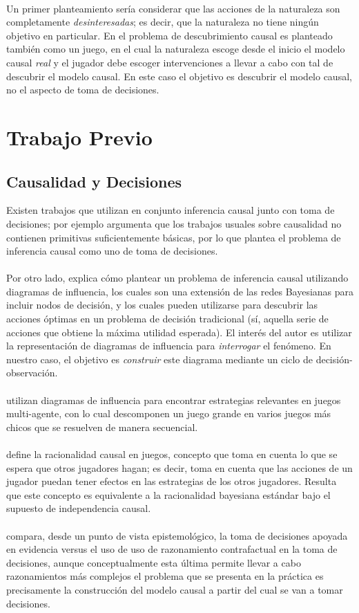 \documentclass[11pt]{article}
\theoremstyle{plain}
\begin{document}
\\
\indent Un primer planteamiento sería considerar que las acciones de la naturaleza son completamente \textit{desinteresadas}; es decir, que la naturaleza no tiene ningún objetivo en particular. En \cite{eberhardt2008causal} el problema de descubrimiento causal es planteado también como un juego, en el cual la naturaleza escoge desde el inicio el modelo causal \textit{real} y el jugador debe escoger intervenciones a llevar a cabo con tal de descubrir el modelo causal. En este caso el objetivo es descubrir el modelo causal, no el aspecto de toma de decisiones.
\section{Trabajo Previo}
\subsection{Causalidad y Decisiones}
Existen trabajos que utilizan en conjunto inferencia causal junto con toma de decisiones; por ejemplo \cite{heckerman1995decision} argumenta que los trabajos usuales sobre causalidad no contienen primitivas suficientemente básicas, por lo que plantea el problema de inferencia causal como uno de toma de decisiones.\\
\\
\indent Por otro lado, \cite{dawid2002influence} explica cómo plantear un problema de inferencia causal utilizando diagramas de influencia, los cuales son una extensión de las redes Bayesianas para incluir nodos de decisión, y los cuales pueden utilizarse para descubrir las acciones óptimas en un problema de decisión tradicional (sí, aquella serie de acciones que obtiene la máxima utilidad esperada). El interés del autor es utilizar la representación de diagramas de influencia para \textit{interrogar} el fenómeno. En nuestro caso, el objetivo es \textit{construir} este diagrama mediante un ciclo de decisión-observación.\\
\\
\indent \cite{koller2003multi} utilizan diagramas de influencia para encontrar estrategias relevantes en juegos multi-agente, con lo cual descomponen un juego grande en varios juegos más chicos que se resuelven de manera secuencial.\\
\\
\indent \cite{board2006equivalence} define la racionalidad causal en juegos, concepto que toma en cuenta lo que se espera que otros jugadores hagan; es decir, toma en cuenta que las acciones de un jugador puedan tener efectos en las estrategias de los otros jugadores. Resulta que este concepto es equivalente a la racionalidad bayesiana estándar bajo el supuesto de independencia causal.\\
\\
\indent \cite{soares2015toward} compara, desde un punto de vista epistemológico, la toma de decisiones apoyada en evidencia versus el uso de uso de razonamiento contrafactual en la toma de decisiones, aunque conceptualmente esta última permite llevar a cabo razonamientos más complejos el problema que se presenta en la práctica es precisamente la construcción del modelo causal a partir del cual se van a tomar decisiones.
\end{document}
